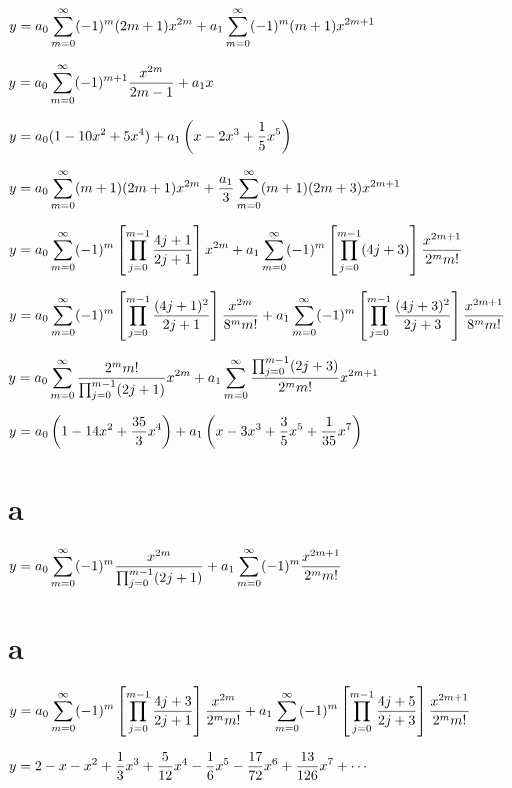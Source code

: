 \medskip

$y=\displaystyle{a_{0}\sum^{\infty}_{m=0}(-1)^{m}(2m+1)x^{2m}+
a_{1}\sum^{\infty}_{m=0}(-1)^{m}(m+1)x^{2m+1}}$

$y=\displaystyle{a_{0}\sum_{m=0}^{\infty}(-1)^{m+1}\frac{x^{2m}}{2m-1}+a_{1}x}$

$y=\displaystyle{a_{0}(1-10x^{2}+5x^{4})+a_{1}\left(x-2x^{3}+\frac{1}{5}x^{5}\right)}$

$y=\displaystyle{a_{0}\sum_{m=0}^{\infty}(m+1)(2m+1)x^{2m}+\frac{a_{1}}{3}\sum_{m=0}^{\infty}
(m+1)(2m+3)x^{2m+1}}$

$y=\displaystyle{a_{0}\sum_{m=0}^{\infty}
(-1)^{m}\left[\prod_{j=0}^{m-1}\frac{4j+1}{2j+1}\right]x^{2m}
+a_{1}\sum_{m=0}^{\infty}
(-1)^{m}\left[\prod_{j=0}^{m-1}(4j+3)\right]{\frac{x^{2m+1}}{2^{m}m!}}}$

$y=\displaystyle{a_{0}\sum_{m=0}^{\infty}
(-1)^{m}\left[\prod_{j=0}^{m-1}\frac{(4j+1)^{2}}{2j+1}\right]{\frac{x^{2m}}{8^{m}m!}}
+a_{1}\sum_{m=0}^{\infty}
(-1)^{m}\left[\prod_{j=0}^{m-1}\frac{(4j+3)^{2}}{2j+3}\right]
{\frac{x^{2m+1}}{8^{m}m!}}}$

$y=\displaystyle{a_{0}\sum_{m=0}^{\infty}\frac{2^{m}m!}{\prod_{j=0}^{m-1}(2j+1)}x^{2m}
+a_{1}\sum_{m=0}^{\infty}\frac{\prod_{j=0}^{m-1}(2j+3)}{2^{m}m!}x^{2m+1}}$

$y=\displaystyle{a_{0}\left(1-14x^{2}+\frac{35}{3}x^{4}\right)+a_{1}\left(x-3x^{3}+\frac{3}{5}x^{5}
+\frac{1}{35}x^{7}\right)}$

 \part{a}
$y=\displaystyle{a_{0}\sum_{m=0}^{\infty}(-1)^{m}\frac{x^{2m}}{\prod_{j=0}^{m-1}(2j+1)}
+a_{1}\sum_{m=0}^{\infty}(-1)^{m}\frac{x^{2m+1}}{2^{m}m!}}$

 \part{a}
$y=\displaystyle{a_{0}\sum_{m=0}^{\infty}
(-1)^{m}\left[\prod_{j=0}^{m-1}\frac{4j+3}{2j+1}\right]{\frac{x^{2m}}{2^{m}m!}}
+a_{1}\sum_{m=0}^{\infty}
(-1)^{m}\left[\prod_{j=0}^{m-1}\frac{4j+5}{2j+3}\right]{\frac{x^{2m+1}}{2^{m}m!}}}$

$y=\displaystyle{2-x-x^{2}+\frac{1}{3}x^{3}+\frac{5}{12}x^{4}-\frac{1}{6}x^{5}-\frac{17}{72}x^{6}
+\frac{13}{126}x^{7}+\cdots}$

